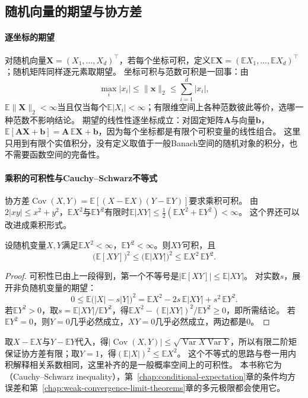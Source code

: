 \subsection{随机向量的期望与协方差}

\paragraph{逐坐标的期望}
对随机向量$\bm X=(X_1,\dots,X_d)^\top$，若每个坐标可积，定义$\mathbb E\bm X=(\mathbb EX_1,\dots,\mathbb EX_d)^\top$；随机矩阵同样逐元素取期望。
坐标可积与范数可积是一回事：由
\[
  \max_i|x_i|\le\lVert\bm x\rVert_2\le\sum_{i=1}^d|x_i|,
\]
$\mathbb E\lVert\bm X\rVert_2<\infty$当且仅当每个$\mathbb E|X_i|<\infty$；有限维空间上各种范数彼此等价，选哪一种范数不影响结论。
期望的线性性逐坐标成立：对固定矩阵$\bm A$与向量$\bm b$，$\mathbb E[\bm A\bm X+\bm b]=\bm A\,\mathbb E\bm X+\bm b$，因为每个坐标都是有限个可积变量的线性组合。
这里只用到有限个实值积分，没有定义取值于一般Banach空间的随机对象的积分，也不需要函数空间的完备性。

\paragraph{乘积的可积性与Cauchy--Schwarz不等式}
协方差$\operatorname{Cov}(X,Y)=\mathbb E[(X-\mathbb EX)(Y-\mathbb EY)]$要求乘积可积。
由$2|xy|\le x^2+y^2$，$\mathbb EX^2$与$\mathbb EY^2$有限时$\mathbb E|XY|\le\tfrac12(\mathbb EX^2+\mathbb EY^2)<\infty$。
这个界还可以改进成乘积形式。

\begin{theorem}
\label{thm:pmod-cauchy-schwarz}
设随机变量$X,Y$满足$\mathbb EX^2<\infty$，$\mathbb EY^2<\infty$。则$XY$可积，且
\[
  \bigl(\mathbb E[XY]\bigr)^2\le\bigl(\mathbb E|XY|\bigr)^2\le\mathbb EX^2\,\mathbb EY^2.
\]
\end{theorem}

\begin{proof}
可积性已由上一段得到，第一个不等号是$|\mathbb E[XY]|\le\mathbb E|XY|$。
对实数$s$，展开非负随机变量的期望：
\[
  0\le\mathbb E\bigl(|X|-s|Y|\bigr)^2=\mathbb EX^2-2s\,\mathbb E|XY|+s^2\,\mathbb EY^2.
\]
若$\mathbb EY^2>0$，取$s=\mathbb E|XY|/\mathbb EY^2$，得$\mathbb EX^2-(\mathbb E|XY|)^2/\mathbb EY^2\ge0$，即所需结论。
若$\mathbb EY^2=0$，则$Y=0$几乎必然成立，$XY=0$几乎必然成立，两边都是$0$。
\end{proof}

取$X-\mathbb EX$与$Y-\mathbb EY$代入，得$|\operatorname{Cov}(X,Y)|\le\sqrt{\operatorname{Var}X\operatorname{Var}Y}$，所以有限二阶矩保证协方差有限；取$Y=1$，得$(\mathbb E|X|)^2\le\mathbb EX^2$。
这个不等式的思路与卷一用内积解释相关系数相同，这里补齐的是一般概率空间上的可积性。
本书称它为（Cauchy--Schwarz inequality），第~\ref{chap:conditional-expectation}章的条件均方误差和第~\ref{chap:weak-convergence-limit-theorems}章的多元极限都会使用它。

